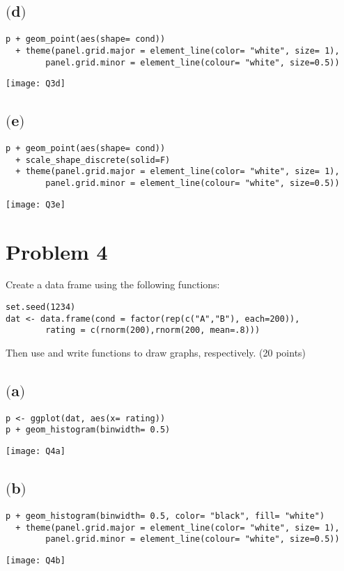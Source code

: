 \documentclass[a4paper,man,natbib]{apa6}
\begin{document}
\subsection{$($d$)$}
\begin{verbatim}
p + geom_point(aes(shape= cond)) 
  + theme(panel.grid.major = element_line(color= "white", size= 1), 
  		panel.grid.minor = element_line(colour= "white", size=0.5)) 
\end{verbatim}
\texttt{[image: Q3d]}

\pagebreak
\subsection{$($e$)$}
\begin{verbatim}
p + geom_point(aes(shape= cond)) 
  + scale_shape_discrete(solid=F) 
  + theme(panel.grid.major = element_line(color= "white", size= 1), 
  		panel.grid.minor = element_line(colour= "white", size=0.5)) 
\end{verbatim}
\texttt{[image: Q3e]}

\pagebreak
\section{Problem 4}
Create a data frame using the following functions: \\
\begin{verbatim}
set.seed(1234)
dat <- data.frame(cond = factor(rep(c("A","B"), each=200)), 
		rating = c(rnorm(200),rnorm(200, mean=.8)))
\end{verbatim}
Then use and write functions to draw graphs, respectively. (20 points) \\

\subsection{$($a$)$}
\begin{verbatim}
p <- ggplot(dat, aes(x= rating))
p + geom_histogram(binwidth= 0.5)
\end{verbatim}
\texttt{[image: Q4a]}

\subsection{$($b$)$}
\begin{verbatim}
p + geom_histogram(binwidth= 0.5, color= "black", fill= "white") 
  + theme(panel.grid.major = element_line(color= "white", size= 1), 
  		panel.grid.minor = element_line(colour= "white", size=0.5))
\end{verbatim}
\texttt{[image: Q4b]}
\end{document}
